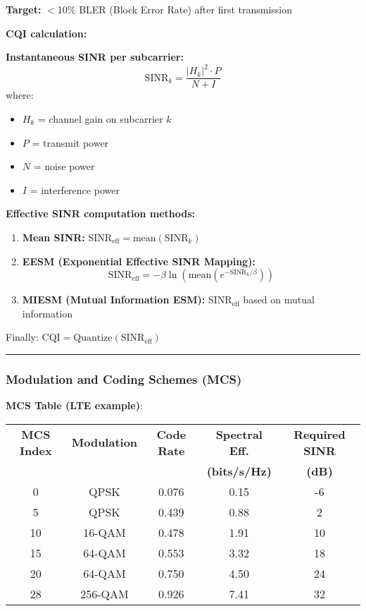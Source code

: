 \textbf{Target:} $<$10\% BLER (Block Error Rate) after first transmission

\textbf{CQI calculation:}

\textbf{Instantaneous SINR per subcarrier:}
\begin{equation*}
\text{SINR}_k = \frac{|H_k|^2 \cdot P}{N + I}
\end{equation*}
where:
\begin{itemize}
\item $H_k$ = channel gain on subcarrier $k$
\item $P$ = transmit power
\item $N$ = noise power
\item $I$ = interference power
\end{itemize}

\textbf{Effective SINR computation methods:}
\begin{enumerate}
\item \textbf{Mean SINR:} $\text{SINR}_{\text{eff}} = \text{mean}(\text{SINR}_k)$
\item \textbf{EESM (Exponential Effective SINR Mapping):} 
\begin{equation*}
\text{SINR}_{\text{eff}} = -\beta \ln\left(\text{mean}\left(e^{-\text{SINR}_k/\beta}\right)\right)
\end{equation*}
\item \textbf{MIESM (Mutual Information ESM):} SINR$_{\text{eff}}$ based on mutual information
\end{enumerate}

Finally: $\text{CQI} = \text{Quantize}(\text{SINR}_{\text{eff}})$

\begin{center}\rule{0.5\linewidth}{0.5pt}\end{center}

\subsubsection{Modulation and Coding Schemes (MCS)}\label{modulation-and-coding-schemes-mcs}

\textbf{MCS Table (LTE example)}:

\begin{center}
\begin{tabular}{@{}ccccc@{}}
\toprule
\textbf{MCS Index} & \textbf{Modulation} & \textbf{Code Rate} & \textbf{Spectral Eff.} & \textbf{Required SINR} \\
 & & & \textbf{(bits/s/Hz)} & \textbf{(dB)} \\
\midrule
0 & QPSK & 0.076 & 0.15 & -6 \\
5 & QPSK & 0.439 & 0.88 & 2 \\
10 & 16-QAM & 0.478 & 1.91 & 10 \\
15 & 64-QAM & 0.553 & 3.32 & 18 \\
20 & 64-QAM & 0.750 & 4.50 & 24 \\
28 & 256-QAM & 0.926 & 7.41 & 32 \\
\bottomrule
\end{tabular}
\end{center}

